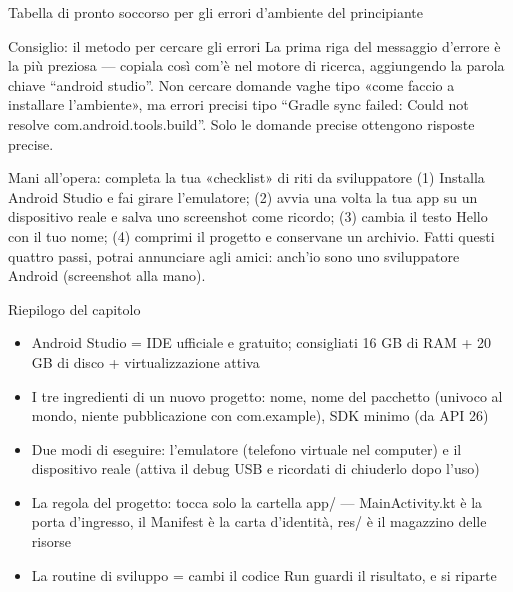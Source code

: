 \begin{center}\small\color{gray}Tabella di pronto soccorso per gli errori d'ambiente del principiante\end{center}

\begin{tcbinfo}{Consiglio: il metodo per cercare gli errori}
La prima riga del messaggio d'errore è la più preziosa — copiala così com'è nel motore di ricerca, aggiungendo la parola chiave “android studio”. Non cercare domande vaghe tipo «come faccio a installare l'ambiente», ma errori precisi tipo “Gradle sync failed: Could not resolve com.android.tools.build”. Solo le domande precise ottengono risposte precise.

\end{tcbinfo}

\begin{tcbpractice}{Mani all'opera: completa la tua «checklist» di riti da sviluppatore}
(1) Installa Android Studio e fai girare l'emulatore; (2) avvia una volta la tua app su un dispositivo reale e salva uno screenshot come ricordo; (3) cambia il testo Hello con il tuo nome; (4) comprimi il progetto e conservane un archivio. Fatti questi quattro passi, potrai annunciare agli amici: anch'io sono uno sviluppatore Android (screenshot alla mano).

\end{tcbpractice}

\begin{tcbsummary}{Riepilogo del capitolo}
\begin{itemize}
  \item Android Studio = IDE ufficiale e gratuito; consigliati 16 GB di RAM + 20 GB di disco + virtualizzazione attiva
  \item I tre ingredienti di un nuovo progetto: nome, nome del pacchetto (univoco al mondo, niente pubblicazione con com.example), SDK minimo (da API 26)
  \item Due modi di eseguire: l'emulatore (telefono virtuale nel computer) e il dispositivo reale (attiva il debug USB e ricordati di chiuderlo dopo l'uso)
  \item La regola del progetto: tocca solo la cartella app/ — MainActivity.kt è la porta d'ingresso, il Manifest è la carta d'identità, res/ è il magazzino delle risorse
  \item La routine di sviluppo = cambi il codice Run guardi il risultato, e si riparte
\end{itemize}

\end{tcbsummary}
